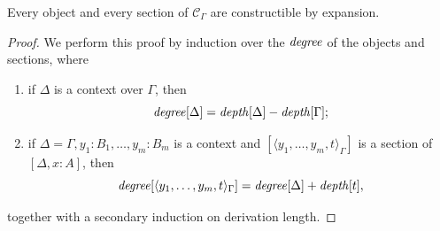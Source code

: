 \begin{lemma} \label{lemma:exhaustivity-for-gats}
    Every object and every section of $\mathcal{C}_\Gamma$ are constructible by expansion.
\end{lemma}
\begin{proof}
    We perform this proof by induction over the $\operatorname{\mathit{degree}}$ of the objects and sections, where
    \begin{enumerate}
        \item if $\Delta$ is a context over $\Gamma$, then \[
            \operatorname{\mathit{degree}}[\Delta] = \operatorname{\mathit{depth}}[\Delta] - \operatorname{\mathit{depth}}[\Gamma];
        \]
        \item if $\Delta = \Gamma, y_1 \colon B_1, \dots, y_m \colon B_m$ is a context and 
            $[\langle y_1, \dots, y_m, t \rangle_\Gamma]$ is a section of $[\Delta, x \colon A]$, then \[
                \operatorname{\mathit{degree}}[\langle y_1, \dots, y_m, t \rangle_\Gamma] = \operatorname{\mathit{degree}}[\Delta] + \operatorname{\mathit{depth}}[t],
            \]
    \end{enumerate}
    together with a secondary induction on derivation length.


\end{proof}
